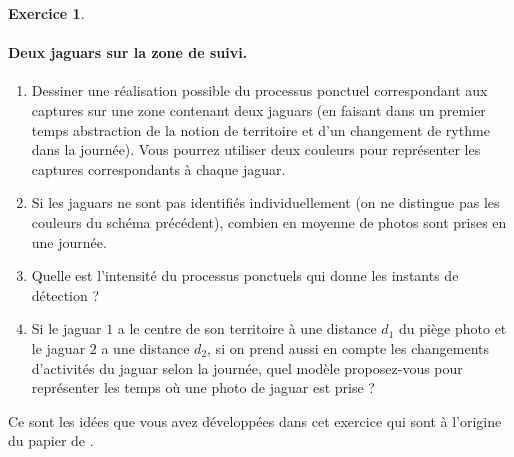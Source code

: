 \documentclass[10pt,fleqn, svgnames]{article}
\theoremstyle{definition}
\newtheorem{exo}{Exercice}
\begin{document}
\begin{exo}
\paragraph{Deux jaguars sur la zone de suivi.}
\begin{enumerate}
\item Dessiner une réalisation possible du processus ponctuel correspondant aux captures sur une zone contenant deux jaguars (en faisant dans un premier temps abstraction de la notion de territoire et d'un changement de rythme dans la journée). Vous pourrez utiliser deux couleurs pour représenter les captures correspondants à chaque jaguar.
\item Si les jaguars ne sont pas identifiés individuellement (on ne distingue pas les couleurs du schéma précédent), combien en moyenne de photos sont prises en une journée.
\item Quelle est l'intensité du   processus ponctuels qui donne les instants de détection ?
\item Si le jaguar $1$ a le centre de son territoire à une distance $d_1$ du piège photo et le jaguar $2$ a une distance $d_2$, si on prend aussi en compte les changements d'activités du jaguar selon la journée, quel modèle proposez-vous pour représenter les temps où une photo de jaguar est prise ?
\end{enumerate}

Ce sont les idées que vous avez développées dans cet exercice qui sont à l'origine du papier de \textcite{distiller2020using}.



\end{exo}



\printbibliography
\end{document}
